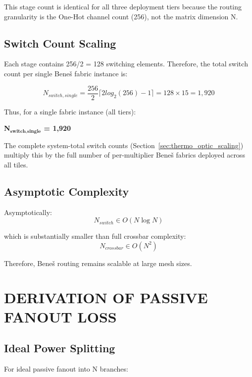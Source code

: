 \documentclass[journal]{IEEEtran}
\begin{document}
This stage count is identical for all three deployment tiers because the routing granularity is the One-Hot channel count (256), not the matrix dimension N.

\subsection{\textbf{Switch Count Scaling}}

Each stage contains 256/2 = 128 switching elements. Therefore, the total switch count per single Beneš fabric instance is:

\begin{equation}
N_{switch,single} = \frac{256}{2} \lceil 2 log_2(256) - 1 \rceil = 128 \times 15 = 1,920
\end{equation}

Thus, for a single fabric instance (all tiers):
\begin{center}
\textbf{N$_{\textbf{switch,single}}$ = 1,920}
\end{center}

The complete system-total switch counts (Section~\ref{sec:thermo_optic_scaling}) multiply this by the full number of per-multiplier Beneš fabrics deployed across all tiles.

\subsection{\textbf{Asymptotic Complexity}}

Asymptotically:
\begin{equation}
N_{switch} \in O(N \log N )
\end{equation}

which is substantially smaller than full crossbar complexity:
\begin{equation}
N_{crossbar} \in O(N^{2})
\end{equation}

Therefore, Beneš routing remains scalable at large mesh sizes.

\section{DERIVATION OF PASSIVE FANOUT LOSS}

\subsection{\textbf{Ideal Power Splitting}}

For ideal passive fanout into N branches:
\end{document}
